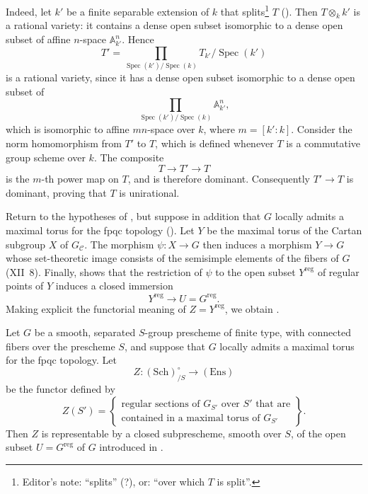 Indeed, let \(k'\) be a finite separable extension of \(k\) that
splits\footnote{Editor's note: ``splits'' (?), or: ``over which \(T\)
is split''.} \(T\) (). Then \(T\otimes_k k'\) is a rational
variety: it contains a dense open subset isomorphic to a dense open
subset of affine \(n\)-space \(\mathbb A^n_{k'}\). Hence
\[
  T'
  =
  \prod_{\operatorname{Spec}(k')/\operatorname{Spec}(k)}
  T_{k'}/\operatorname{Spec}(k')
\]
is a rational variety, since it has a dense open subset isomorphic to
a dense open subset of
\[
  \prod_{\operatorname{Spec}(k')/\operatorname{Spec}(k)}
  \mathbb A^n_{k'},
\]
which is isomorphic to affine \(mn\)-space over \(k\), where
\(m=[k':k]\). Consider the norm homomorphism from \(T'\) to \(T\),
which is defined whenever \(T\) is a commutative group scheme over
\(k\). The composite
\[
  T\longrightarrow T'\longrightarrow T
\]
is the \(m\)-th power map on \(T\), and is therefore dominant.
Consequently \(T'\to T\) is dominant, proving that \(T\) is
unirational.

Return to the hypotheses of , but suppose in addition that \(G\)
locally admits a maximal torus for the fpqc topology (). Let
\(Y\) be the maximal torus of the Cartan subgroup \(X\) of
\(G_{\mathcal C}\). The morphism \(\psi:X\to G\) then induces a
morphism \(Y\to G\) whose set-theoretic image consists of the
semisimple elements of the fibers of \(G\) (XII~8). Finally, 
shows that the restriction of \(\psi\) to the open subset
\(Y^{\mathrm{reg}}\) of regular points of \(Y\) induces a closed
immersion
\[
  Y^{\mathrm{reg}}\longrightarrow U=G^{\mathrm{reg}}.
\]
Making explicit the functorial meaning of
\(Z=Y^{\mathrm{reg}}\), we obtain .

\begin{corollary}
Let \(G\) be a smooth, separated \(S\)-group prescheme of finite
type, with connected fibers over the prescheme \(S\), and suppose
that \(G\) locally admits a maximal torus for the fpqc topology. Let
\[
  Z:(\mathrm{Sch})^\circ_{/S}\longrightarrow(\mathrm{Ens})
\]
be the functor defined by
\[
  Z(S')
  =
  \left\{
    \begin{array}{c}
      \text{regular sections of \(G_{S'}\) over \(S'\) that are}\\
      \text{contained in a maximal torus of \(G_{S'}\)}
    \end{array}
  \right\}.
\]
Then \(Z\) is representable by a closed subprescheme, smooth over
\(S\), of the open subset \(U=G^{\mathrm{reg}}\) of \(G\) introduced
in .
\end{corollary}


